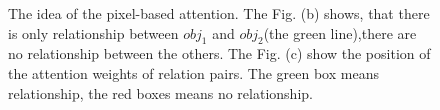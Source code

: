 \begin{figure}[h]
	\caption[The idea of the pixel-based attention]{The idea of the pixel-based attention. The Fig. (b) shows, that there is only relationship between $obj_1$ and $obj_2$(the green line),there are no relationship between the others. The Fig. (c) show the position of the attention weights of  relation pairs. The green box means relationship, the red boxes means no relationship.}
	\label{fig:idea_pixelloss}
\end{figure}

